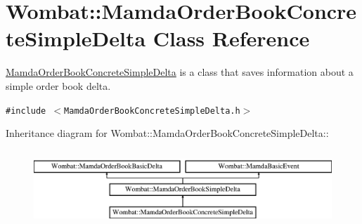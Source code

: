 \hypertarget{classWombat_1_1MamdaOrderBookConcreteSimpleDelta}{
\section{Wombat::Mamda\-Order\-Book\-Concrete\-Simple\-Delta Class Reference}
\label{classWombat_1_1MamdaOrderBookConcreteSimpleDelta}
}
\hyperlink{classWombat_1_1MamdaOrderBookConcreteSimpleDelta}{Mamda\-Order\-Book\-Concrete\-Simple\-Delta} is a class that saves information about a simple order book delta.  


{\tt \#include $<$Mamda\-Order\-Book\-Concrete\-Simple\-Delta.h$>$}

Inheritance diagram for Wombat::Mamda\-Order\-Book\-Concrete\-Simple\-Delta::\begin{figure}[H]
\begin{center}
\leavevmode
\includegraphics[height=2.8866cm]{classWombat_1_1MamdaOrderBookConcreteSimpleDelta}
\end{center}
\end{figure}

